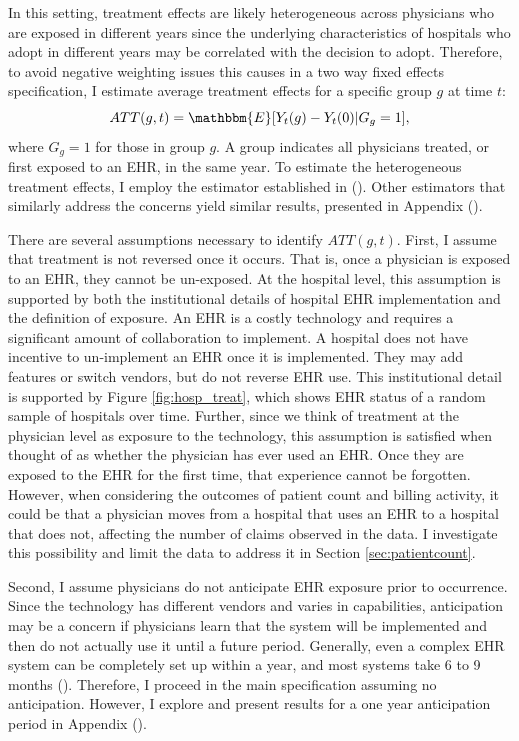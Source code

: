 \documentclass[11pt]{article}
\begin{document}
In this setting, treatment effects are likely heterogeneous across physicians who are exposed in different years since the underlying characteristics of hospitals who adopt in different years may be correlated with the decision to adopt. Therefore, to avoid negative weighting issues this causes in a two way fixed effects specification, I estimate average treatment effects for a specific group $g$ at time $t$: 
$$ATT(g,t)=\mathbbm{E}[Y_t(g)-Y_t(0)|G_g=1],$$
where $G_g=1$ for those in group $g$. A group indicates all physicians treated, or first exposed to an EHR, in the same year. To estimate the heterogeneous treatment effects, I employ the estimator established in \citeauthor{callaway2021difference} (\citeyear{callaway2021difference}). Other estimators that similarly address the concerns yield similar results, presented in Appendix ().

There are several assumptions necessary to identify $ATT(g,t)$. First, I assume that treatment is not reversed once it occurs. That is, once a physician is exposed to an EHR, they cannot be un-exposed. At the hospital level, this assumption is supported by both the institutional details of hospital EHR implementation and the definition of exposure. An EHR is a costly technology and requires a significant amount of collaboration to implement. A hospital does not have incentive to un-implement an EHR once it is implemented. They may add features or switch vendors, but do not reverse EHR use. This institutional detail is supported by Figure \ref{fig:hosp_treat}, which shows EHR status of a random sample of hospitals over time. Further, since we think of treatment at the physician level as exposure to the technology, this assumption is satisfied when thought of as whether the physician has ever used an EHR. Once they are exposed to the EHR for the first time, that experience cannot be forgotten. However, when considering the outcomes of patient count and billing activity, it could be that a physician moves from a hospital that uses an EHR to a hospital that does not, affecting the number of claims observed in the data. I investigate this possibility and limit the data to address it in Section \ref{sec:patientcount}. 

Second, I assume physicians do not anticipate EHR exposure prior to occurrence. Since the technology has different vendors and varies in capabilities, anticipation may be a concern if physicians learn that the system will be implemented and then do not actually use it until a future period. Generally, even a complex EHR system can be completely set up within a year, and most systems take 6 to 9 months (\cite{uzialko_2021}). Therefore, I proceed in the main specification assuming no anticipation. However, I explore and present results for a one year anticipation period in Appendix (). 
\end{document}
